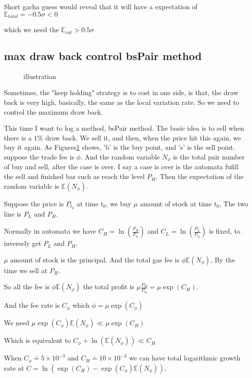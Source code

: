 \documentclass{article}
\theoremstyle{definition} %
\begin{document}
Short gacha guess would reveal
that it will have a expectation of
$\mathbb{E}_{total}=-0.5\sigma<0$

which we need the
$\mathbb{E}_{cut}>0.5\sigma$

\subsection[bsPair]{max draw back control bsPair method}
\begin{figure}[!ht]
    \centering
    \caption{illustration}
    \label{fig:bsPair}
\end{figure}

Sometimes, the "keep holding" strategy is
to cost in one side, is that, the draw
back is very high, basically, the same
as the local variation rate.
So we need to control the maximum draw back.

This time I want to log a method,
bsPair method.
The basic idea is to sell when there is a
$1\%$ draw back. We sell it, and then,
when the price hit this again, we buy it again.
As Figures\ref{fig:bsPair} shows,
'b' is the buy point, and 's' is the
sell point.
suppose the trade fee is $\phi$.
And the random variable $N_{\phi}$ is the
total pair number of buy and sell,
after the case is over.
I say a case is over is the automata fufill
the sell and finished bar such as reach the
level $P_H$.
Then the expectation of the random variable
is $\mathbb{E}(N_{\phi})$.

Suppose the price is $P_{t_0}$ at time $t_0$,
we buy $\mu$ amount of stock at time $t_0$,
The two line is $P_L$ and $P_H$.

Normally in automata we have
$C_H=\ln(\frac{P_H}{P_{t_0}})$
and
$C_L=\ln(\frac{P_L}{P_{t_0}})$
is fixed, to inversely get $P_L$ and $P_H$.

$\mu$ amount of stock is the principal.
And the total gas fee is
$\phi\mathbb{E}(N_{\phi})$,
By the time we sell at $P_H$.

So all the fee is $\phi\mathbb{E}(N_{\phi})$
the total profit is
$\mu\frac{P_H}{P_{t_0}}=\mu\exp(C_H)$.

And the fee rate is $C_\phi$
which $\phi=\mu\exp(C_\phi)$

We need
$\mu\exp(C_\phi)\mathbb{E}(N_{\phi})
    \ll
    \mu\exp(C_H)$

Which is equivalent to
$C_\phi+\ln(\mathbb{E}(N_{\phi}))
    \ll
    C_H$

When $C_\phi\doteq5\times10^{-3}$
and
$C_H\doteq10\times10^{-3}$
we can have total logarithmic growth
rate at
$C=
    \ln(
    \exp(C_H)-\exp(C_\phi)\mathbb{E}(N_{\phi}))$.
\end{document}

